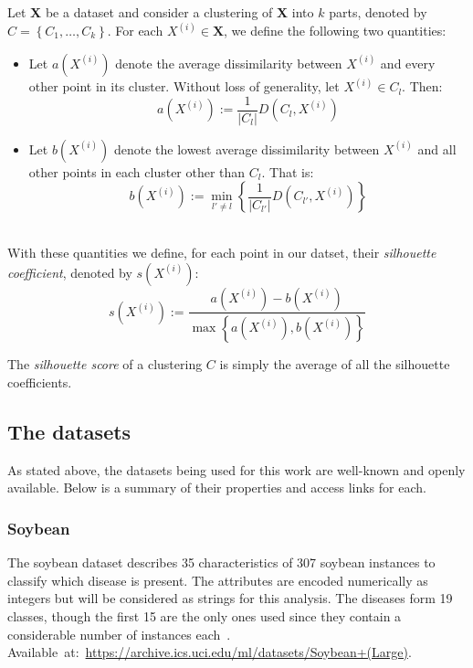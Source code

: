 \begin{definition}\label{def:silhouette}
    Let \textbf{X} be a dataset and consider a clustering of \textbf{X} into
    \(k\) parts, denoted by \(C = \left\{C_1, \ldots, C_k\right\}\). For each
    \(X^{(i)} \in \textbf{X}\), we define the following two quantities:
    \begin{itemize}
        \item Let \(a\left(X^{(i)}\right)\) denote the average dissimilarity
            between \(X^{(i)}\) and every other point in its cluster. Without
            loss of generality, let \(X^{(i)} \in C_l\). Then:
            \[
                a\left(X^{(i)}\right) := \frac{1}{|C_l|} D\left(C_l,
                X^{(i)}\right)
            \]
        \item Let \(b\left(X^{(i)}\right)\) denote the lowest average 
            dissimilarity between \(X^{(i)}\) and all other points in each
            cluster other than \(C_l\). That is:
            \[
                b\left(X^{(i)}\right) := \min_{l' \neq l} \left\{
                \frac{1}{|C_{l'}|} D\left(C_{l'}, X^{(i)}\right) \right\}
            \]\\
    \end{itemize}

    With these quantities we define, for each point in our datset, their
    \emph{silhouette coefficient}, denoted by \(s(X^{(i)})\):
    \[
        s(X^{(i)}) := \frac{a\left(X^{(i)}\right) -
        b\left(X^{(i)}\right)}{\max\left\{a\left(X^{(i)}\right),
        b\left(X^{(i)}\right)\right\}}
    \]

    The \emph{silhouette score} of a clustering \(C\) is simply the average of
all the silhouette coefficients.
\end{definition}


\subsection{The datasets}\label{subsec:datasets}

As stated above, the datasets being used for this work are well-known and openly
available. Below is a summary of their properties and access links for each.

\subsubsection*{Soybean}

The soybean dataset describes 35 characteristics of 307 soybean instances to
classify which disease is present. The attributes are encoded numerically as
integers but will be considered as strings for this analysis.
The diseases form 19 classes, though the first 15 are the only ones used since
they contain a considerable number of instances each~\cite{Soybean}. 
Available~at:~\url{https://archive.ics.uci.edu/ml/datasets/Soybean+(Large)}.


